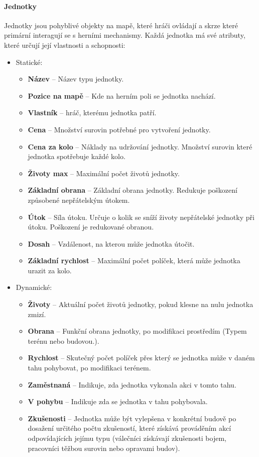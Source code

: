 \paragraph{Jednotky}
Jednotky jsou pohyblivé objekty na mapě, které hráči ovládají a skrze které primární interagují se s herními mechanismy. Každá jednotka má své atributy, které určují její vlastnosti a schopnosti:
\begin{itemize}
    \item Statické:
    \begin{itemize}
        \item \textbf{Název} -- Název typu jednotky.
        \item \textbf{Pozice na mapě} -- Kde na herním poli se jednotka nachází.
        \item \textbf{Vlastník} – hráč, kterému jednotka patří.
        \item \textbf{Cena} -- Množství surovin potřebné pro vytvoření jednotky.
        \item \textbf{Cena za kolo} -- Náklady na udržování jednotky. Množství surovin které jednotka spotřebuje každé kolo.
        \item \textbf{Životy max} -- Maximální počet životů jednotky.
         \item \textbf{Základní obrana} -- Základní obrana jednotky. Redukuje poškození způsobené nepřátelským útokem.
        \item \textbf{Útok} -- Síla útoku. Určuje o kolik se sníží životy nepřátelské jednotky při útoku. Poškození je redukované obranou. 
        \item \textbf{Dosah} -- Vzdálenost, na kterou může jednotka útočit.
        \item \textbf{Základní rychlost} – Maximální počet políček, která může jednotka urazit za kolo.
    \end{itemize}
    \item Dynamické:
    \begin{itemize}
        \item \textbf{Životy} -- Aktuální počet životů jednotky, pokud klesne na nulu jednotka zmizí.
        \item \textbf{Obrana} -- Funkční obrana jednotky, po modifikaci prostředím (Typem terénu nebo budovou.).
        \item \textbf{Rychlost} -- Skutečný počet políček přes který se jednotka může v daném tahu pohybovat, po modifikaci terénem.
        \item \textbf{Zaměstnaná} -- Indikuje, zda jednotka vykonala akci v tomto tahu.
        \item \textbf{V pohybu} -- Indikuje zda se jednotka v tahu pohybovala.
        \item \textbf{Zkušenosti} -- Jednotka může být vylepšena v konkrétní budově po dosažení určitého počtu zkušeností, které získává prováděním akcí odpovídajících jejímu typu (válečníci získávají zkušenosti bojem, pracovníci těžbou surovin nebo opravami budov).
    \end{itemize}
\end{itemize}

